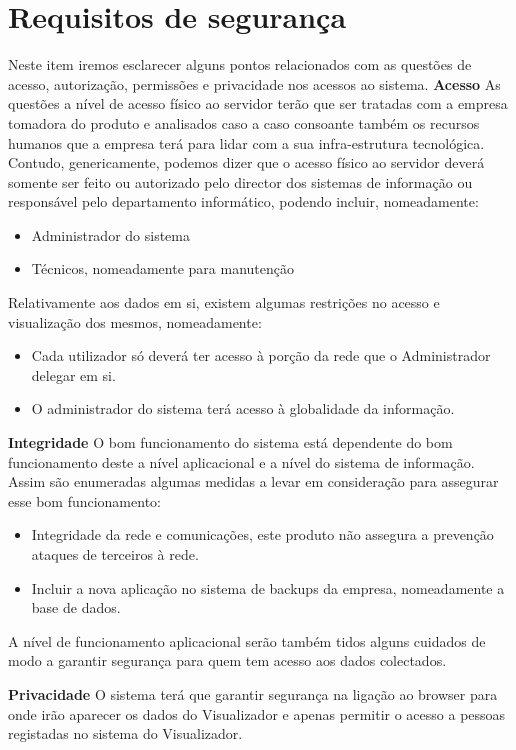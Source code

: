 \section{Requisitos de segurança}
Neste item iremos esclarecer alguns pontos relacionados com as questões de acesso, autorização, permissões e privacidade nos acessos ao sistema.
\textbf{Acesso} As questões a nível de acesso físico ao servidor terão que ser tratadas com a empresa tomadora do produto e analisados caso a caso
consoante também os recursos humanos que a empresa terá para lidar com a sua infra-estrutura tecnológica.
Contudo, genericamente, podemos dizer que o acesso físico ao servidor deverá somente ser feito ou autorizado pelo director dos sistemas de
informação ou responsável pelo departamento informático, podendo incluir, nomeadamente:

\begin{itemize}
\item Administrador do sistema
\item Técnicos, nomeadamente para manutenção
\end{itemize}

Relativamente aos dados em si, existem algumas restrições no acesso e visualização dos mesmos, nomeadamente:
\begin{itemize}
\item Cada utilizador só deverá ter acesso à porção da rede que o Administrador delegar em si.
\item O administrador do sistema terá acesso à globalidade da informação.
\end{itemize}

\textbf{Integridade}
O bom funcionamento do sistema está dependente do bom funcionamento deste a nível aplicacional e a nível do sistema de informação.
Assim são enumeradas algumas medidas a levar em consideração para assegurar esse bom funcionamento:
\begin{itemize}
\item Integridade da rede e comunicações, este produto não assegura a prevenção ataques de terceiros à rede.
\item Incluir a nova aplicação no sistema de backups da empresa, nomeadamente a base de dados.
\end{itemize}

A nível de funcionamento aplicacional serão também tidos alguns cuidados de modo a garantir segurança para quem tem acesso aos dados colectados.

\textbf{Privacidade}
O sistema terá que garantir segurança na ligação ao browser para onde irão aparecer os dados do Visualizador e apenas
permitir o acesso a pessoas registadas no sistema do Visualizador.

